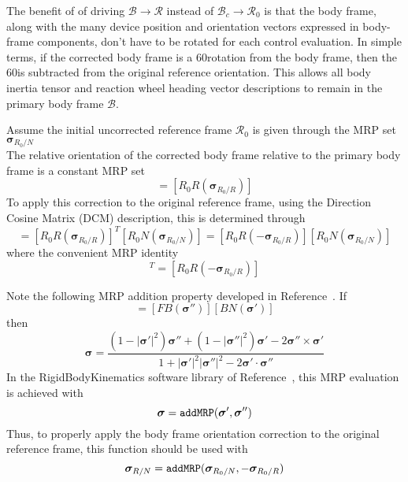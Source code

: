\documentclass[]{AVSSimReportMemo}
\begin{document}
The benefit of of driving $\mathcal{B} \rightarrow \mathcal{R}$ instead of $\mathcal{B}_{c} \rightarrow \mathcal{R}_{0}$ is that the body frame, along with the many device position and orientation vectors expressed in  body-frame components, don't have to be rotated for each control evaluation.  In simple terms, if the corrected body frame is a 60\dg rotation from the body frame, then the 60\dg is subtracted from the original reference orientation.  This allows all body inertia tensor and reaction wheel heading vector descriptions to remain in the primary body frame $\mathcal{B}$.  

Assume the initial uncorrected reference frame $\mathcal{R}_{0}$ is given through the MRP set $\bm\sigma_{R_{0}/N}$
\begin{equation}
	[R_{0}N(	\bm\sigma_{R_{0}/N})]
\end{equation}
The relative orientation of the corrected body frame relative to the primary body frame is a constant MRP set
\begin{equation}
	[B_{c}B(\bm\sigma_{B_{c}/B})] = [R_{0}R(\bm\sigma_{R_{0}/R})]
\end{equation}
To apply this correction to the original reference frame, using the Direction Cosine Matrix (DCM) description, this is determined through
\begin{equation}
	[RN(\bm\sigma_{R/N})] = [R_{0}R(\bm\sigma_{R_{0}/R})]^{T} [R_{0}N(\bm\sigma_{R_{0}/N})] = 
	[R_{0}R(-\bm\sigma_{R_{0}/R})] [R_{0}N(\bm\sigma_{R_{0}/N})]
\end{equation}
where the convenient MRP identity
\begin{equation}
	 [R_{0}R(\bm\sigma_{R_{0}/R})]^{T} = [R_{0}R(-\bm\sigma_{R_{0}/R})] 
\end{equation}

Note the following MRP addition property developed in Reference~.  If
\begin{equation}
	[BN(\bm\sigma)] = [FB(\bm\sigma '')] [ BN(\bm\sigma ')]
\end{equation}
then
\begin{equation}
	\bm\sigma = \frac{
		(1-|\bm\sigma'|^{2})\bm\sigma '' + (1-|\bm\sigma ''|^{2}) \bm\sigma ' - 2 \bm\sigma '' \times \bm\sigma '
	}{
		1 + |\bm\sigma '|^{2} |\bm\sigma''|^{2} - 2 \bm\sigma' \cdot \bm\sigma''
	}
\end{equation}
In the RigidBodyKinematics software library of Reference~, this MRP evaluation is achieved with 
$$
	\bm\sigma = {\tt addMRP}(\bm\sigma ', \bm\sigma'')
$$
Thus, to properly apply the body frame orientation correction to the original reference frame, this function should be used with
$$
	\bm\sigma_{R/N} = {\tt addMRP}(\bm\sigma_{R_{0}/N}, -\bm\sigma_{R_{0}/R})
$$
\end{document}
